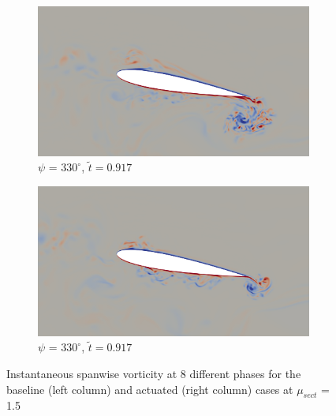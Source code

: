 \begin{figure}[H]
	\begin{subfigure}[b]{0.4\textwidth}
		\centering
		\includegraphics[width=1\textwidth]{figures/zonal_adapt_results/AC/mu_1pt5/baseline/phase_330.png}
		\caption{ $\psi$ = $330^\circ$, $\tilde{t}=0.917$}
		\label{fig:mu_1pt5_baseline_psi330}
	\end{subfigure}
	\begin{subfigure}[b]{0.4\textwidth}
		\centering
		\includegraphics[width=1\textwidth]{figures/zonal_adapt_results/AC/mu_1pt5/AC/phase_330.png}
		\caption{ $\psi$ = $330^\circ$, $\tilde{t}=0.917$}
		\label{fig:mu_1pt5_AC_psi330}
	\end{subfigure}
	
	
	
	
	\caption{Instantaneous spanwise vorticity at 8 different phases for the baseline (left column) and actuated (right column) cases at $\mu_{sect}$ = 1.5}
	\label{fig:vortScreen_mu1pt5}
\end{figure}
